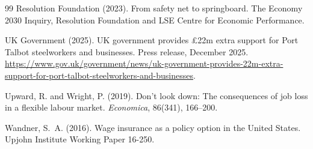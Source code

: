 \begin{thebibliography}{99}
Resolution Foundation (2023).
\newblock From safety net to springboard.
\newblock The Economy 2030 Inquiry, Resolution Foundation and LSE Centre for Economic Performance.

UK Government (2025).
\newblock UK government provides \pounds 22m extra support for Port Talbot steelworkers and businesses.
\newblock Press release, December 2025. \url{https://www.gov.uk/government/news/uk-government-provides-22m-extra-support-for-port-talbot-steelworkers-and-businesses}.

Upward, R. and Wright, P. (2019).
\newblock Don't look down: The consequences of job loss in a flexible labour market.
\newblock \emph{Economica}, 86(341), 166--200.

Wandner, S.~A. (2016).
\newblock Wage insurance as a policy option in the United States.
\newblock Upjohn Institute Working Paper 16-250.

\end{thebibliography}
